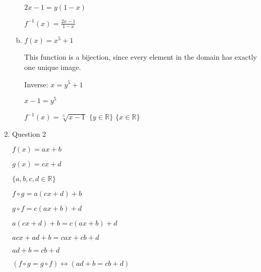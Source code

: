 \documentclass[11pt]{article}
\begin{document}
\begin{enumerate}
\begin{enumerate}[(a)]
				$2x - 1 = y(1 - x)$

				$f^{-1}(x) = \frac{2x-1}{1-x}$ \\

			\item $f(x) = x^5 + 1$

				This function is a bijection, since every element in the domain has exactly one unique
				image.

				Inverse: $x = y^5 + 1$

				$x-1 = y^5$

				$f^{-1}(x) = \sqrt[5]{x-1}$
				$\{y \in \mathbb{R}\}$
				$\{x \in \mathbb{R}\}$


		\end{enumerate}

	\item Question 2

		$f(x) = ax + b$

		$g(x) = cx + d$

		$\{a, b, c, d \in \mathbb{R}\}$

		$f \circ g = a(cx + d) + b$

		$g \circ f = c(ax + b) + d$

		$a(cx + d) + b = c(ax + b) + d$

		$acx + ad + b = cax + cb + d$

		$ad + b = cb + d$

		$(f \circ g = g \circ f) \leftrightarrow
		(ad + b = cb + d)$ \\


\end{enumerate}
\end{document}
